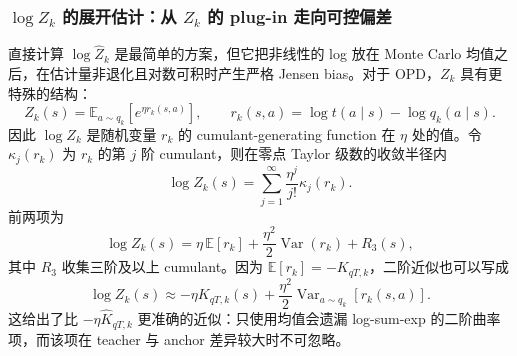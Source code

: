 \subsubsection*{$\log Z_k$ 的展开估计：从 $Z_k$ 的 plug-in 走向可控偏差}
直接计算 $\log\widehat Z_k$ 是最简单的方案，但它把非线性的 log 放在 Monte Carlo 均值之后，在估计量非退化且对数可积时产生严格 Jensen bias。对于 OPD，$Z_k$ 具有更特殊的结构：
\begin{equation}
Z_k(s)=\mathbb E_{a\sim q_k}\left[e^{\eta r_k(s,a)}\right],
\qquad
r_k(s,a)=\log t(a\mid s)-\log q_k(a\mid s).
\label{eq:ch2-opd-z-cumulant-start}
\end{equation}
因此 $\log Z_k$ 是随机变量 $r_k$ 的 cumulant-generating function 在 $\eta$ 处的值。令 $\kappa_j(r_k)$ 为 $r_k$ 的第 $j$ 阶 cumulant，则在零点 Taylor 级数的收敛半径内
\begin{equation}
\log Z_k(s)=\sum_{j=1}^{\infty}\frac{\eta^j}{j!}\kappa_j(r_k).
\label{eq:ch2-opd-logz-cumulant-series}
\end{equation}
前两项为
\begin{equation}
\log Z_k(s)=\eta\,\mathbb E[r_k]
 +\frac{\eta^2}{2}\operatorname{Var}(r_k)
 +R_3(s),
\label{eq:ch2-opd-logz-second-order}
\end{equation}
其中 $R_3$ 收集三阶及以上 cumulant。因为 $\mathbb E[r_k]=-K_{qT,k}$，二阶近似也可以写成
\begin{equation}
\log Z_k(s)\approx-\eta K_{qT,k}(s)
 +\frac{\eta^2}{2}\operatorname{Var}_{a\sim q_k}[r_k(s,a)].
\label{eq:ch2-opd-logz-kl-expansion}
\end{equation}
这给出了比 $-\eta\widehat K_{qT,k}$ 更准确的近似：只使用均值会遗漏 log-sum-exp 的二阶曲率项，而该项在 teacher 与 anchor 差异较大时不可忽略。

